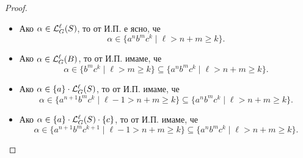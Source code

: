 \begin{proof}
\begin{itemize}
    \begin{itemize}
    \item
      Ако $\alpha \in \mathcal{L}^\ell_G(S)$, то от И.П. е ясно, че
      \[\alpha \in \{a^nb^mc^k \mid \ell > n+m \geq k\}.\]
    \item
      Ако $\alpha \in \mathcal{L}^\ell_G(B)$, то от И.П. имаме, че
      \[\alpha \in \{b^mc^k \mid \ell > m \geq k\} \subseteq \{a^nb^mc^k \mid \ell > n+m \geq k\}.\]
    \item
      Ако $\alpha \in \{a\} \cdot \mathcal{L}^{\ell}_G(S)$, то от И.П. имаме, че
      \[\alpha \in \{a^{n+1}b^mc^k \mid \ell - 1 > n+m \geq k\} \subseteq \{a^nb^mc^k \mid \ell > n+m \geq k\}.\]
    \item
      Ако $\alpha \in \{a\} \cdot \mathcal{L}^{\ell}_G(S) \cdot \{c\}$, то от И.П. имаме, че
      \[\alpha \in \{a^{n+1}b^mc^{k+1} \mid \ell - 1 > n+m \geq k\} \subseteq \{a^nb^mc^k \mid \ell > n+m \geq k\}.\]
    \end{itemize}
  \end{itemize}


\end{proof}

